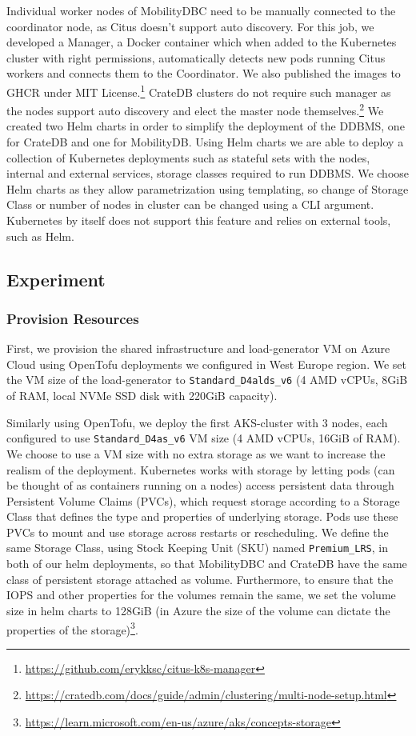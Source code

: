 Individual worker nodes of MobilityDBC need to be manually connected to the coordinator node, as Citus doesn't support auto discovery.
For this job, we developed a Manager, a Docker container which when added to the Kubernetes cluster with right permissions, automatically detects new pods running Citus workers and connects them to the Coordinator.
We also published the images to GHCR under MIT License.\footnote{\url{https://github.com/erykksc/citus-k8s-manager}}
CrateDB clusters do not require such manager as the nodes support auto discovery and elect the master node themselves.\footnote{\url{https://cratedb.com/docs/guide/admin/clustering/multi-node-setup.html}}
We created two Helm charts in order to simplify the deployment of the DDBMS, one for CrateDB and one for MobilityDB.
Using Helm charts we are able to deploy a collection of Kubernetes deployments such as stateful sets with the nodes, internal and external services, storage classes required to run DDBMS.
We choose Helm charts as they allow parametrization using templating, so change of Storage Class or number of nodes in cluster can be changed using a CLI argument.
Kubernetes by itself does not support this feature and relies on external tools, such as Helm.

\subsection{Experiment}
\label{sec:experiment-results}

\subsubsection{Provision Resources}
First, we provision the shared infrastructure and load-generator VM on Azure Cloud using OpenTofu deployments we configured in West Europe region.
We set the VM size of the load-generator to \verb|Standard_D4alds_v6| (4 AMD vCPUs, 8GiB of RAM, local NVMe SSD disk with 220GiB capacity).

Similarly using OpenTofu, we deploy the first AKS-cluster with 3 nodes, each configured to use \verb|Standard_D4as_v6| VM size (4 AMD vCPUs, 16GiB of RAM).
We choose to use a VM size with no extra storage as we want to increase the realism of the deployment.
Kubernetes works with storage by letting pods (can be thought of as containers running on a nodes) access persistent data through Persistent Volume Claims (PVCs), which request storage according to a Storage Class that defines the type and properties of underlying storage.
Pods use these PVCs to mount and use storage across restarts or rescheduling.
We define the same Storage Class, using Stock Keeping Unit (SKU) named \verb|Premium_LRS|, in both of our helm deployments, so that MobilityDBC and CrateDB have the same class of persistent storage attached as volume.
Furthermore, to ensure that the IOPS and other properties for the volumes remain the same, we set the volume size in helm charts to 128GiB (in Azure the size of the volume can dictate the properties of the storage)\footnote{\url{https://learn.microsoft.com/en-us/azure/aks/concepts-storage}}.


